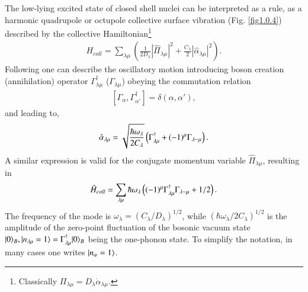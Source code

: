 The low-lying excited state of closed shell nuclei can be interpreted as a rule, as a harmonic quadrupole or octupole collective surface vibration (Fig. \ref{fig1.0.4}) described by the collective Hamiltonian\footnote{Classically $\Pi_{\lambda\mu}=D_\lambda\dot\alpha_{\lambda\mu}$.}
\begin{align}\label{eq1.0.7}
H_{coll}=\sum_{\lambda\mu}\left(\frac{1}{2D_{\lambda}}|\hat\Pi_{\lambda\mu}|^2+\frac{C_\lambda}{2}|\hat \alpha_{\lambda\mu}|^2\right).
\end{align}
Following \cite{Dirac:26} one can describe the oscillatory motion introducing boson creation (annihilation) operator $\Gamma_{\lambda\mu}^\dagger$ ($\Gamma_{\lambda\mu}$) obeying the commutation relation
\begin{align}\label{eq1.0.8}
\left[\Gamma_{\alpha},\Gamma_{\alpha'}^\dagger\right]=\delta(\alpha,\alpha'),
\end{align}
and leading to, 
\begin{align}\label{eq1.0.9}
\hat\alpha_{\lambda\mu}=\sqrt{\frac{\hbar\omega_\lambda}{2C_\lambda}}\left(\Gamma_{\lambda\mu}^\dagger+(-1)^\mu\Gamma_{\lambda-\mu}\right).\idx{Surface vibrations!zero-point fluctuations}
\end{align}
 A similar expression is valid for the conjugate momentum variable $\hat\Pi_{\lambda\mu}$, resulting in 
\begin{align}\label{eq1.0.9b}
\hat H_{coll}=\sum_{\lambda\mu}\hbar\omega_\lambda\left((-1)^\mu\Gamma_{\lambda\mu}^\dagger\Gamma_{\lambda-\mu}+1/2\right). \idx{Elementary modes of excitation!surface vibrations}
\end{align}
The frequency of the mode is $\omega_\lambda=(C_\lambda/D_\lambda)^{1/2}$, while $(\hbar\omega_\lambda/2C_\lambda)^{1/2}$ is the amplitude of the zero-point fluctuation of the bosonic vacuum state $|{0} \rangle_B,|{n_{\lambda\mu}=1} \rangle=\Gamma_{\lambda\mu}^\dagger |{0} \rangle_B$ being the one-phonon state. To simplify the notation, in many cases one writes $|{n_\alpha=1} \rangle$.
